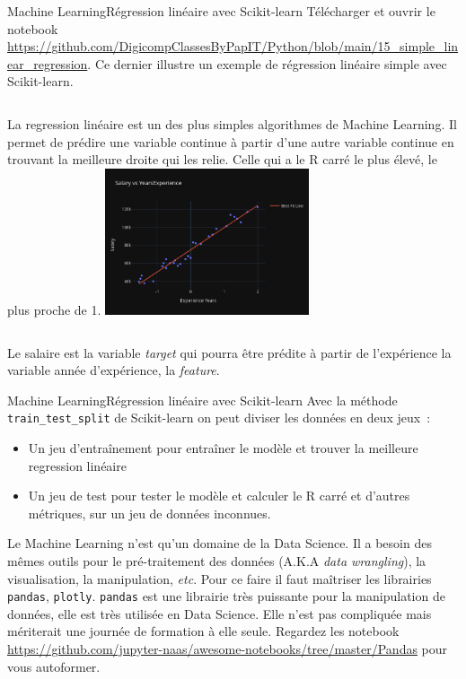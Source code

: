 \documentclass{beamer}
\begin{document}
    \begin{frame}{Machine Learning}{Régression linéaire avec Scikit-learn}
        Télécharger et ouvrir le notebook \url{https://github.com/DigicompClassesByPapIT/Python/blob/main/15_simple_linear_regression}.
        Ce dernier illustre un exemple de régression linéaire simple avec Scikit-learn.
        \bigbreak
        \begin{columns}
            La regression linéaire est un des plus simples algorithmes de Machine Learning.
            Il permet de prédire une variable continue à partir d'une autre variable continue en trouvant la meilleure droite qui les relie.
            Celle qui a le R carré le plus élevé, le plus proche de 1.
            \centering
            \includegraphics[width=6cm]{image/linear-regression}
        \end{columns}
        \bigbreak
        Le salaire est la variable \textit{target} qui pourra être prédite à partir de l'expérience la variable année d'expérience, la \textit{feature}.
    \end{frame}

    \begin{frame}{Machine Learning}{Régression linéaire avec Scikit-learn}
        Avec la méthode \lstinline{train_test_split} de Scikit-learn on peut diviser les données en deux jeux~:
        \begin{itemize}
            \item Un jeu d'entraînement pour entraîner le modèle et trouver la meilleure regression linéaire
            \item Un jeu de test pour tester le modèle et calculer le R carré et d'autres métriques, sur un jeu de données inconnues.
        \end{itemize}
        \begin{dangercolorbox}
            Le Machine Learning n'est qu'un domaine de la Data Science.
            Il a besoin des mêmes outils pour le pré-traitement des données (A.K.A \textit{data wrangling}), la visualisation, la manipulation, \textit{etc}.
            Pour ce faire il faut maîtriser les librairies \lstinline{pandas}, \lstinline{plotly}.
            \lstinline{pandas} est une librairie très puissante pour la manipulation de données, elle est très utilisée en Data Science.
            Elle n'est pas compliquée mais mériterait une journée de formation à elle seule.
            Regardez les notebook \url{https://github.com/jupyter-naas/awesome-notebooks/tree/master/Pandas} pour vous autoformer.
        \end{dangercolorbox}
    \end{frame}
\end{document}
